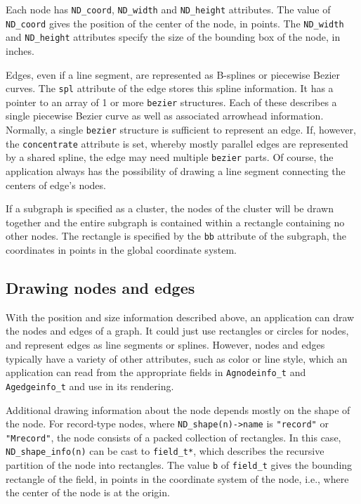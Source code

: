 Each node has {\tt ND\_coord}, {\tt ND\_width} and {\tt ND\_height} 
attributes. The value
of {\tt ND\_coord} gives the position of the center of the node, in points.
The {\tt ND\_width} and {\tt ND\_height} attributes specify the size of the
bounding box of the node, in inches.

Edges, even if a line segment, are represented as B-splines or
piecewise Bezier curves.
The {\tt spl} attribute of the edge stores this spline information.
It has a pointer to an array of 1 or more {\tt bezier} structures. Each
of these describes a single piecewise Bezier curve as well as associated
arrowhead information. Normally, a single {\tt bezier} structure is
sufficient to represent an edge. If, however, the {\tt concentrate}
attribute is set, whereby mostly parallel edges are represented by a
shared spline, the edge may need multiple {\tt bezier} parts.
Of course, the application always has the possibility of drawing a line
segment connecting the centers of edge's nodes.

If a subgraph is specified as a cluster, the nodes of the cluster
will be drawn together and the entire subgraph is contained within
a rectangle containing no other nodes. The rectangle is specified by
the {\tt bb} attribute of the subgraph, the coordinates in points in
the global coordinate system.

\subsection{Drawing nodes and edges}
\label{sec:nodes}

With the position and size information described above, an application 
can draw the nodes and edges of a graph. It could just use rectangles 
or circles for nodes, and represent edges as line segments or splines.
However, nodes and edges typically have a variety of other attributes,
such as color or line style, which an application can read from the
appropriate
fields in {\tt Agnodeinfo\_t} and {\tt Agedgeinfo\_t} and use
in its rendering.

Additional drawing information about the node depends mostly on the shape
of the node. 
For record-type nodes, where \verb+ND_shape(n)->name+ is {\tt "record"} or 
{\tt "Mrecord"}, the node consists of a packed collection
of rectangles. In this case, \verb+ND_shape_info(n)+ can be cast to
\verb+field_t*+, which describes the recursive partition of the node
into rectangles. The value {\tt b} of \verb+field_t+
gives the bounding rectangle of the field, in points in the coordinate
system of the node, i.e., where the center of the node is at the
origin. 

